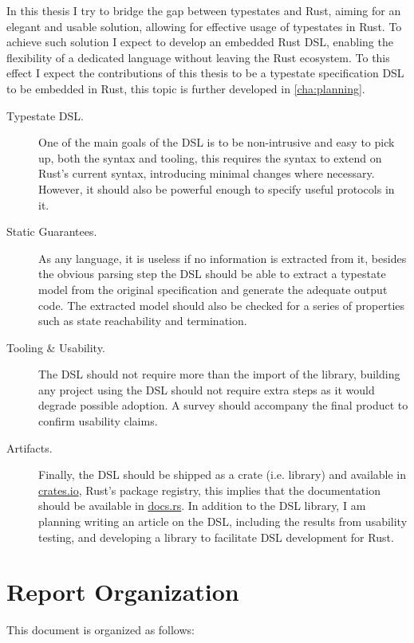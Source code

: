 In this thesis I try to bridge the gap between typestates and Rust,
aiming for an elegant and usable solution, allowing for effective usage of typestates in Rust.
To achieve such solution I expect to develop an embedded Rust DSL,
enabling the flexibility of a dedicated language without leaving the Rust ecosystem.
To this effect I expect the contributions of this thesis to be a typestate specification DSL to be embedded in Rust,
this topic is further developed in \autoref{cha:planning}.

\begin{description}
    \item[Typestate DSL.] One of the main goals of the DSL is to be non-intrusive and easy to pick up, both the syntax and tooling,
          this requires the syntax to extend on Rust's current syntax, introducing minimal changes where necessary.
          However, it should also be powerful enough to specify useful protocols in it.
    \item[Static Guarantees.] As any language, it is useless if no information is extracted from it,
          besides the obvious parsing step the DSL should be able to extract a typestate model from the original specification
          and generate the adequate output code.
          The extracted model should also be checked for a series of properties such as state reachability and termination.
    \item[Tooling \& Usability.] The DSL should not require more than the import of the library,
          building any project using the DSL should not require extra steps as it would degrade possible adoption.
          A survey should accompany the final product to confirm usability claims.
    \item[Artifacts.] Finally, the DSL should be shipped as a crate (i.e. library) and available in \url{crates.io}, Rust's package registry,
          this implies that the documentation should be available in \url{docs.rs}.
          In addition to the DSL library, I am planning writing an article on the DSL, including the results from usability testing,
          and developing a library to facilitate DSL development for Rust.
\end{description}

\section{Report Organization}\label{sec:organization}

This document is organized as follows:

